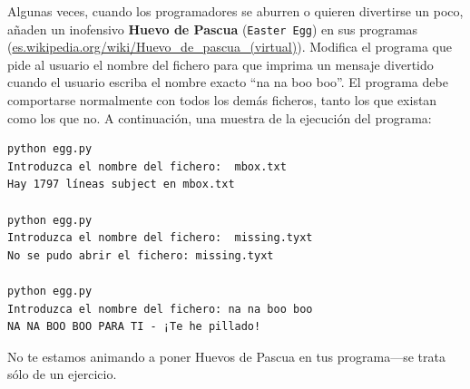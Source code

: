 \begin{ex}
Algunas veces, cuando los programadores se aburren o quieren divertirse un poco,
añaden un inofensivo {\bf Huevo de Pascua} ({\tt Easter Egg}) en sus programas
(\url{es.wikipedia.org/wiki/Huevo_de_pascua_(virtual)}). Modifica el programa
que pide al usuario el nombre del fichero para que imprima un mensaje
divertido cuando el usuario escriba el nombre exacto ``na na boo boo''.
El programa debe comportarse normalmente con todos los demás ficheros,
tanto los que existan como los que no. A continuación, una muestra de la ejecución
del programa:

\beforeverb
\begin{verbatim}
python egg.py 
Introduzca el nombre del fichero:  mbox.txt
Hay 1797 líneas subject en mbox.txt

python egg.py 
Introduzca el nombre del fichero:  missing.tyxt
No se pudo abrir el fichero: missing.tyxt

python egg.py 
Introduzca el nombre del fichero: na na boo boo
NA NA BOO BOO PARA TI - ¡Te he pillado!
\end{verbatim}
\afterverb
%
No te estamos animando a poner Huevos de Pascua en tus
programa---se trata sólo de un ejercicio.

\end{ex}